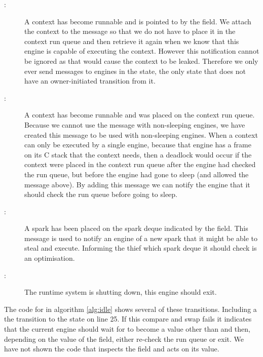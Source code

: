 \begin{description}

    \item[:]
    A context has become runnable and is pointed to by the
     field.
    We attach the context to the message so that we do not have to place it
    in the context run queue and then retrieve it again when we know that
    this engine is capable of executing the context.
    However this notification cannot be ignored as that would cause the
    context to be leaked.
    Therefore we only ever send  messages to engines in
    the  state,
    the only state that does not have an owner-initiated transition from 
    it.

    \item[:]
    A context has become runnable and was placed on the context run queue.
    Because we cannot use the  message with
    non-sleeping engines,
    we have created this message to be used with non-sleeping engines.
    When a context can only be executed by a single engine,
    because that engine has a frame on its C stack that the context needs,
    then a deadlock would occur if the context were placed in the context run
    queue after the engine had checked the run queue,
    but before the engine had gone to sleep (and allowed the message above).
    By adding this message we can notify the engine that it should check the
    run queue before going to sleep.

    \item[:]
    A spark has been placed on the spark deque indicated by the
     field.
    This message is used to notify an engine of a new spark that it might be
    able to steal and execute.
    Informing the thief which spark deque it should check is an
    optimisation.

    \item[:]
    The runtime system is shutting down, this engine should exit.

\end{description}

\noindent
{}
The code for \idle in algorithm \ref{alg:idle} shows several of these
transitions.
Including a the transition to the  state on line 25.
If this compare and swap fails it indicates that the current engine should 
wait for  to become a value other than  and then,
depending on the value of the  field,
either re-check the run queue or exit.
We have not shown the code that inspects the  field and acts on
its value.

